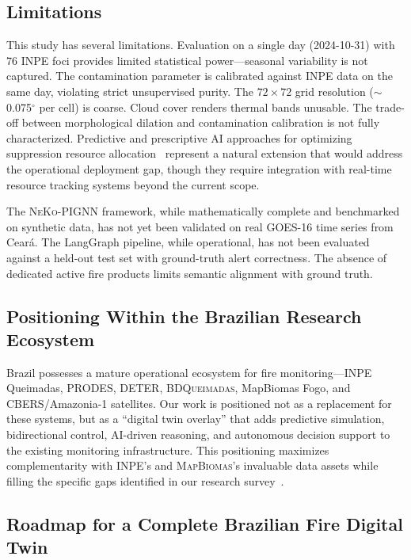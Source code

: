\documentclass[11pt,twocolumn,a4paper]{article}
\newcommand{\abbrev}[1]{{\small\textsc{#1}}}
\begin{document}
\subsection{Limitations}

This study has several limitations. Evaluation on a single day (2024-10-31) with 76 \abbrev{INPE} foci provides limited statistical power---seasonal variability is not captured. The contamination parameter is calibrated against \abbrev{INPE} data on the same day, violating strict unsupervised purity. The $72\times 72$ grid resolution ($\sim$0.075$^\circ$ per cell) is coarse. Cloud cover renders thermal bands unusable. The trade-off between morphological dilation and contamination calibration is not fully characterized. Predictive and prescriptive AI approaches for optimizing suppression resource allocation~\cite{boussioux2026} represent a natural extension that would address the operational deployment gap, though they require integration with real-time resource tracking systems beyond the current scope.

The \abbrev{NeKo-PIGNN} framework, while mathematically complete and benchmarked on synthetic data, has not yet been validated on real \abbrev{GOES-16} time series from Cear\'{a}. The LangGraph pipeline, while operational, has not been evaluated against a held-out test set with ground-truth alert correctness. The absence of dedicated active fire products limits semantic alignment with ground truth.

\subsection{Positioning Within the Brazilian Research Ecosystem}

Brazil possesses a mature operational ecosystem for fire monitoring---\abbrev{INPE} Queimadas, \abbrev{PRODES}, \abbrev{DETER}, \abbrev{BDQueimadas}, MapBiomas Fogo, and \abbrev{CBERS}/Amazonia-1 satellites. Our work is positioned not as a replacement for these systems, but as a ``digital twin overlay'' that adds predictive simulation, bidirectional control, \abbrev{AI}-driven reasoning, and autonomous decision support to the existing monitoring infrastructure. This positioning maximizes complementarity with \abbrev{INPE}'s and \abbrev{MapBiomas}'s invaluable data assets while filling the specific gaps identified in our research survey~\cite{morsali2026,sun2024,marli2024}.

\subsection{Roadmap for a Complete Brazilian Fire Digital Twin}
\end{document}
